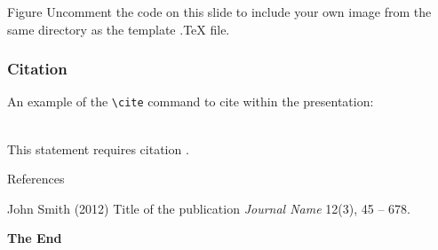 \documentclass[aspectratio=169,xcolor=dvipsnames]{beamer}
\begin{document}
\begin{frame}{Figure}
    Uncomment the code on this slide to include your own image from the same directory as the template .TeX file.
\end{frame}


\begin{frame}[fragile] %
    \frametitle{Citation}
    An example of the \verb|\cite| command to cite within the presentation:\\~

    This statement requires citation \cite{p1}.
\end{frame}


\begin{frame}{References}
    \footnotesize{
        \begin{thebibliography}{99}
             John Smith (2012)
            \newblock Title of the publication
            \newblock \emph{Journal Name} 12(3), 45 -- 678.
        \end{thebibliography}
    }
\end{frame}


\begin{frame}
    \Huge{\centerline{\textbf{The End}}}
\end{frame}

\end{document}
